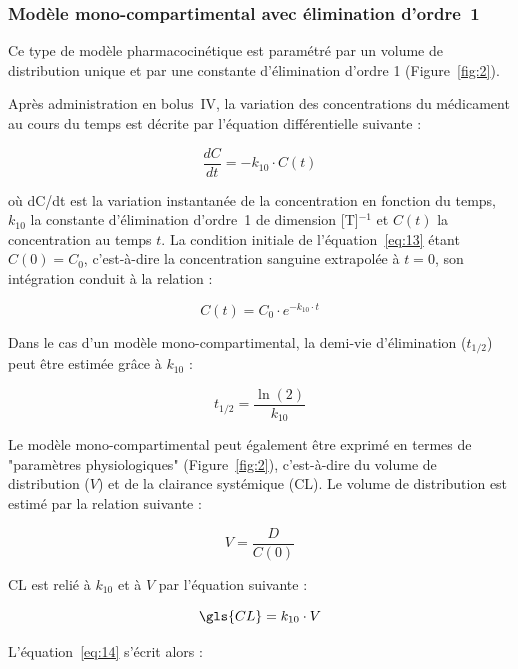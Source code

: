 \subsubsection{Modèle mono-compartimental avec élimination d'ordre~1}
Ce type de modèle pharmacocinétique est paramétré par un volume de distribution unique et par une constante d'élimination d'ordre 1 (Figure~\ref{fig:2}).

Après administration en bolus~\gls{IV}, la variation des concentrations du médicament au cours du temps est décrite par l'équation différentielle suivante :

\begin{equation}
\frac{dC}{dt} = -k_{10} \cdot C(t)
\label{eq:13}
\end{equation}

où dC/dt est la variation instantanée de la concentration en fonction du temps, $k_{10}$ la constante d'élimination d'ordre~1 de dimension [T]$^{-1}$ et $C(t)$ la concentration au temps $t$. La condition initiale de l'équation~\ref{eq:13} étant $C(0) = C_0$, c'est-à-dire la concentration sanguine extrapolée à $t = 0$, son intégration conduit à la relation :

\begin{equation}
C(t) = C_0 \cdot e^{-k_{10}\cdot t}
\label{eq:14}
\end{equation}

Dans le cas d'un modèle mono-compartimental, la demi-vie d'élimination ($t_{1/2}$) peut être estimée grâce à $k_{10}$ :

\begin{equation}
t_{1/2} = \frac{\ln(2)}{k_{10}}
\label{eq:15}
\end{equation}

Le modèle mono-compartimental peut également être exprimé en termes de "paramètres physiologiques" (Figure~\ref{fig:2}), c'est-à-dire du volume de distribution ($V$) et de la clairance systémique (\gls{CL}). Le volume de distribution est estimé par la relation suivante :

\begin{equation}
V = \frac{D}{C(0)}
\label{eq:16}
\end{equation}

\gls{CL} est relié à $k_{10}$ et à $V$ par l'équation suivante :

\begin{equation}
\gls{CL} = k_{10} \cdot V
\label{eq:17}
\end{equation}

L'équation~\ref{eq:14} s'écrit alors :

